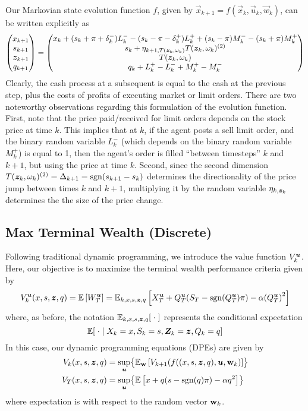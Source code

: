 Our Markovian state evolution function $f$, given by $\vec{x}_{k+1} = f \left( \vec{x}_{k},\vec{u}_{k}, \vec{w}_{k} \right)$, can be written explicitly as
\begin{equation}
\label{eq:discretestateevolution}
\begin{pmatrix}
x_{k+1} \\
s_{k+1} \\
\bm{z}_{k+1} \\
q_{k+1} 
\end{pmatrix} = \begin{pmatrix}
x_k + (s_k + \pi + \delta_k^-)L_k^- - (s_k - \pi - \delta_k^+)L_k^+ + (s_k - \pi)M_k^- - (s_k + \pi)M_k^+ \\
s_{k} + \eta_{k+1,T(\bm{z}_k, \omega_k)} T(\bm{z}_k, \omega_k)^{(2)} \\
T(\bm{z}_k, \omega_k) \\
q_{k} + L_k^+ - L_k^- + M_k^+ - M_k^-
\end{pmatrix}
\end{equation}
Clearly, the cash process at a subsequent is equal to the cash at the previous step, plus the costs of profits of executing market or limit orders. There are two noteworthy observations regarding this formulation of the evolution function. First, note that the price paid/received for limit orders depends on the stock price at time $k$. This implies that at $k$, if the agent posts a sell limit order, and the binary random variable $L_k^-$ (which depends on the binary random variable $M_k^+$) is equal to 1, then the agent's order is filled ``between timesteps'' $k$ and $k+1$, but using the price at time $k$. Second, since the second dimension $T(\bm{z}_k, \omega_k)^{(2)} = \Delta_{k+1} = \operatorname{\mathrm{sgn}}(s_{k+1} - s_k)$ determines the directionality of the price jump between times $k$ and $k+1$, multiplying it by the random variable $\eta_{k,\bm{z}_k}$ determines the the size of the price change.

\subsection{Max Terminal Wealth (Discrete)}
Following traditional dynamic programming, we introduce the value function $V_k^{\bm{u}}$. Here, our objective is to maximize the terminal wealth performance criteria given by
\begin{equation}
V_k^{\bm{u}} (x,s,\bm{z},q) = \mathbb{E} \left[ W_T^{\bm{u}} \right] = \mathbb{E}_{k,x,s,\bm{z},q}\left[ X_T^{\bm{u}} + Q_T^{\bm{u}}(S_T - \operatorname{\mathrm{sgn}}(Q_T^{\bm{u}})\pi) - \alpha {(Q_T^{\bm{u}})}^2 \right]
\end{equation}
where, as before, the notation $\mathbb{E}_{k,x,s,\bm{z},q}[ \; \cdot \; ]$ represents the conditional expectation
\[ \mathbb{E} [ \; \cdot \; | \; X_k = x, S_k = s, \bm{Z}_k = \bm{z}, Q_k = q] \]
In this case, our dynamic programming equations (DPEs) are given by
\begin{align}
V_k (x,s,\bm{z},q) & = \sup_{\bm{u}} \bigl\lbrace \mathbb{E}_{\mathbf{w}} \left[ V_{k+1} (f((x,s,\bm{z},q),\bm{u},\mathbf{w}_k) \right] \bigr\rbrace \\
V_T (x,s,\bm{z},q) & = \sup_{\bm{u}} \bigl\lbrace \mathbb{E} \left[ x + q(s-\operatorname{\mathrm{sgn}}(q)\pi) - \alpha q^2 \right] \bigr\rbrace
\end{align}
where expectation is with respect to the random vector $\mathbf{w}_k$.

